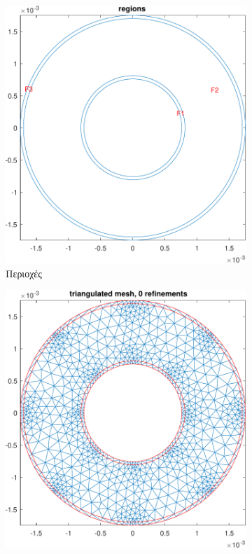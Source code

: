 \documentclass[10pt, letterpaper]{article}
\begin{document}
\begin{figure}[h!]
  \centering
  \begin{subfigure}[b]{0.3\textwidth}
      \centering
      \includegraphics[width=\textwidth]{coaxial_regions.pdf}
      \caption{Περιοχές\vspace{1\baselineskip}}
      \label{fig:coaxial_regions}
  \end{subfigure}
  \hfill
  \begin{subfigure}[b]{0.3\textwidth}
      \centering
      \includegraphics[width=\textwidth]{coaxial_mesh_0.pdf}

\end{subfigure}
\end{figure}
\end{document}
